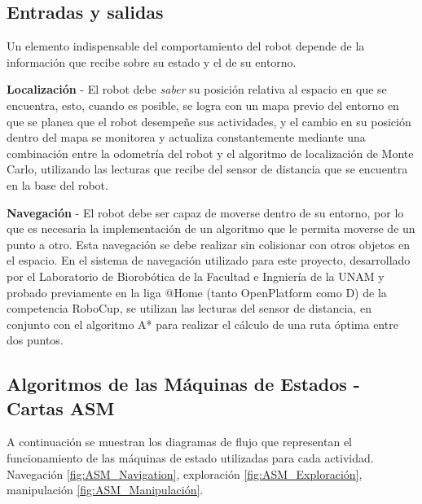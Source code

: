 \subsection{Entradas y salidas}
Un elemento indispensable del comportamiento del robot depende de la información que recibe sobre su estado y el de su entorno.


\textbf{Localización} - El robot debe \textit{saber} su posición relativa al espacio en que se encuentra, esto, cuando es posible, se logra con un mapa previo del entorno en que se planea que el robot desempeñe sus actividades, y el cambio en su posición dentro del mapa se monitorea y actualiza constantemente mediante una combinación entre la odometría del robot y el algoritmo de localización de Monte Carlo, utilizando las lecturas que recibe del sensor de distancia que se encuentra en la  base del robot.

\textbf{Navegación} - El robot debe ser capaz de moverse dentro de su entorno, por lo que es necesaria la implementación de un algoritmo que le permita moverse de un punto a otro. Esta navegación se debe realizar sin colisionar con otros objetos en el espacio. En el sistema de navegación utilizado para este proyecto, desarrollado por el Laboratorio de Biorobótica de la Facultad e Ingniería de la UNAM y probado previamente en la liga @Home (tanto OpenPlatform como D) de la competencia RoboCup, se utilizan las lecturas del sensor de distancia, en conjunto con el algoritmo A* para realizar el cálculo de una ruta óptima entre dos puntos. 

\subsection{Algoritmos de las Máquinas de Estados - Cartas ASM}
A continuación se muestran los diagramas de flujo que representan el funcionamiento de las máquinas de estado utilizadas para cada actividad. Navegación \ref{fig:ASM_Navigation}, exploración \ref{fig:ASM_Exploración}, manipulación \ref{fig:ASM_Manipulación}.

